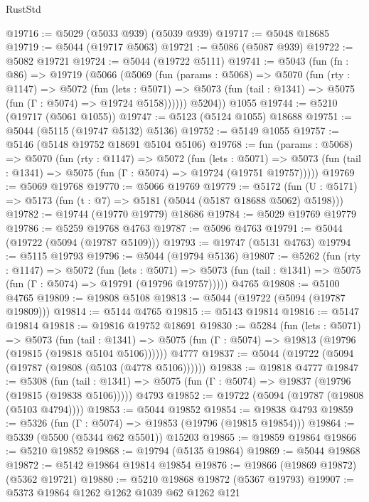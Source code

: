 \begin{lexlean}{RustStd}
\begin{coremodule}
@19716 := @5029 (@5033 @939) (@5039 @939)
@19717 := @5048 @18685
@19719 := @5044 (@19717 @5063)
@19721 := @5086 (@5087 @939)
@19722 := @5082 @19721
@19724 := @5044 (@19722 @5111)
@19741 := @5043
    (fun (fn : @86) =>
    @19719
      (@5066
        (@5069
          (fun (params : @5068) =>
          @5070
            (fun (rty : @1147) =>
            @5072
              (fun (lets : @5071) =>
              @5073 (fun (tail : @1341) => @5075 (fun (Γ : @5074) => @19724 @5158))))))
        @5204))
    @1055
@19744 := @5210 (@19717 (@5061 @1055))
@19747 := @5123 (@5124 @1055) @18688
@19751 := @5044 (@5115 (@19747 @5132) @5136)
@19752 := @5149 @1055
@19757 := @5146 (@5148 @19752 @18691 @5104 @5106)
@19768 := fun (params : @5068) =>
  @5070
    (fun (rty : @1147) =>
    @5072
      (fun (lets : @5071) =>
      @5073 (fun (tail : @1341) => @5075 (fun (Γ : @5074) => @19724 (@19751 @19757)))))
@19769 := @5069 @19768
@19770 := @5066 @19769
@19779 := @5172
    (fun (U : @5171) => @5173 (fun (t : @7) => @5181 (@5044 (@5187 @18688 @5062) @5198)))
@19782 := @19744 (@19770 @19779) @18686
@19784 := @5029 @19769 @19779
@19786 := @5259 @19768 @4763
@19787 := @5096 @4763
@19791 := @5044 (@19722 (@5094 (@19787 @5109)))
@19793 := @19747 (@5131 @4763)
@19794 := @5115 @19793
@19796 := @5044 (@19794 @5136)
@19807 := @5262
    (fun (rty : @1147) =>
    @5072
      (fun (lets : @5071) =>
      @5073 (fun (tail : @1341) => @5075 (fun (Γ : @5074) => @19791 (@19796 @19757)))))
    @4765
@19808 := @5100 @4765
@19809 := @19808 @5108
@19813 := @5044 (@19722 (@5094 (@19787 @19809)))
@19814 := @5144 @4765
@19815 := @5143 @19814
@19816 := @5147 @19814
@19818 := @19816 @19752 @18691
@19830 := @5284
    (fun (lets : @5071) =>
    @5073
      (fun (tail : @1341) =>
      @5075 (fun (Γ : @5074) => @19813 (@19796 (@19815 (@19818 @5104 @5106))))))
    @4777
@19837 := @5044 (@19722 (@5094 (@19787 (@19808 (@5103 (@4778 @5106))))))
@19838 := @19818 @4777
@19847 := @5308
    (fun (tail : @1341) => @5075 (fun (Γ : @5074) => @19837 (@19796 (@19815 (@19838 @5106)))))
    @4793
@19852 := @19722 (@5094 (@19787 (@19808 (@5103 @4794))))
@19853 := @5044 @19852
@19854 := @19838 @4793
@19859 := @5326 (fun (Γ : @5074) => @19853 (@19796 (@19815 @19854)))
@19864 := @5339 (@5500 (@5344 @62 @5501)) @15203
@19865 := @19859 @19864
@19866 := @5210 @19852
@19868 := @19794 (@5135 @19864)
@19869 := @5044 @19868
@19872 := @5142 @19864 @19814 @19854
@19876 := @19866 (@19869 @19872) (@5362 @19721)
@19880 := @5210 @19868 @19872 (@5367 @19793)
@19907 := @5373
    @19864
    @1262
    @1262
    @1039
    @62
    @1262
    @121

\end{coremodule}
\end{lexlean}
